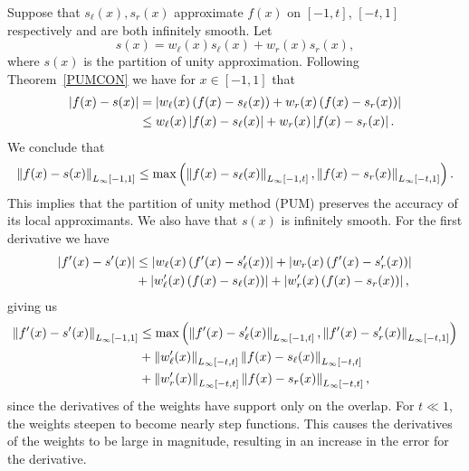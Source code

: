 Suppose that $s_{\ell}(x),s_{r}(x)$ approximate $f(x)$ on $[-1,t]$, $[-t,1]$ respectively and are both infinitely smooth. Let
\begin{equation}
s(x) = w_{\ell}(x)s_{\ell}(x)+w_{r}(x)s_{r}(x),
\label{PUM2}
\end{equation}
where $s(x)$ is the partition of unity approximation. Following Theorem~\ref{PUMCON} we have for $x \in [-1,1]$ that
\begin{equation}
\begin{aligned}
\left | f(x)-s(x) \right | &= \left | w_{\ell}(x) \left( f(x) - s_{\ell}(x) \right) + w_{r}(x) \left( f(x) - s_{r}(x) \right) \right | \\
&\leq w_{\ell}(x) \left | f(x) - s_{\ell}(x) \right | + w_{r}(x) \left | f(x) - s_{r}(x) \right |.
\end{aligned}
\end{equation}
We conclude that
\begin{align}
\left \| f(x)-s(x) \right \|_{L_{\infty}[-1,1]} \leq \max \left( \left \| f(x)-s_{\ell}(x) \right \|_{L_{\infty}[-1,t]} , \left \| f(x)-s_{r}(x) \right \|_{L_{\infty}[-t,1]} \right).
\label{POU_UP}
\end{align}
This implies that the partition of unity method (PUM) preserves the accuracy of its local approximants. We also have that $s(x)$ is infinitely smooth. For the first derivative we have
\begin{equation}
\begin{aligned}
\left | f'(x)-s'(x) \right | &\leq \left | w_{\ell}(x) \left( f'(x)-s_{\ell}'(x) \right) \right |+\left | w_{r}(x) \left( f'(x)-s_{r}'(x) \right) \right | \\
&+\left | w_{\ell
}'(x) \left( f(x)-s_{\ell}(x) \right) \right | +\left | w_{r}'(x) \left( f(x)-s_{r}(x) \right) \right |,
\end{aligned}
\end{equation}
giving us
\begin{equation}
\begin{aligned}
\left \| f'(x)-s'(x) \right \|_{L_{\infty}[-1,1]} &\leq \max \left( \left \| f'(x)-s_{\ell}'(x) \right \|_{L_{\infty}[-1,t]} , \left \| f'(x)-s_{r}'(x) \right \|_{L_{\infty}[-t,1]} \right) \\
&+\left \| w_{\ell}'(x) \right \|_{L_{\infty}[-t,t]} \left \| f(x)-s_{\ell}(x)\right \|_{L_{\infty}[-t,t]}\\ 
&+ \left \| w_{r}'(x) \right \|_{L_{\infty}[-t,t]} \left \| f(x)-s_{r}(x)\right \|_{L_{\infty}[-t,t]},
\end{aligned}
\label{diff_error}
\end{equation}
since the derivatives of the weights have support only on the overlap. For $t \ll 1$, the weights steepen to become nearly step functions. This causes the derivatives of the weights to be large in magnitude, resulting in an increase in the error for the derivative.

